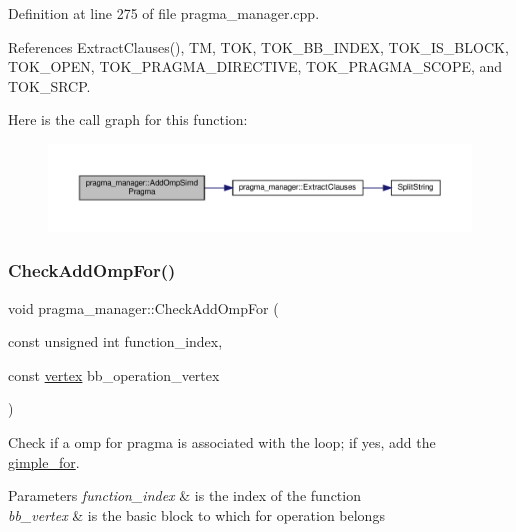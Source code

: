 Definition at line 275 of file pragma\+\_\+manager.\+cpp.



References Extract\+Clauses(), TM, T\+OK, T\+O\+K\+\_\+\+B\+B\+\_\+\+I\+N\+D\+EX, T\+O\+K\+\_\+\+I\+S\+\_\+\+B\+L\+O\+CK, T\+O\+K\+\_\+\+O\+P\+EN, T\+O\+K\+\_\+\+P\+R\+A\+G\+M\+A\+\_\+\+D\+I\+R\+E\+C\+T\+I\+VE, T\+O\+K\+\_\+\+P\+R\+A\+G\+M\+A\+\_\+\+S\+C\+O\+PE, and T\+O\+K\+\_\+\+S\+R\+CP.

Here is the call graph for this function\+:
\nopagebreak
\begin{figure}[H]
\begin{center}
\leavevmode
\includegraphics[width=350pt]{d2/d1d/classpragma__manager_ad0fd54d0ee85c926008a7c0ed76dfaa3_cgraph}
\end{center}
\end{figure}
\mbox{\label{classpragma__manager_a4d74b44eafacef0dd1b64d29f941e692}} 
\subsubsection{\texorpdfstring{Check\+Add\+Omp\+For()}{CheckAddOmpFor()}}
{\footnotesize\ttfamily void pragma\+\_\+manager\+::\+Check\+Add\+Omp\+For (\begin{DoxyParamCaption}\item[{const unsigned int}]{function\+\_\+index,  }\item[{const \hyperlink{graph_8hpp_abefdcf0544e601805af44eca032cca14}{vertex}}]{bb\+\_\+operation\+\_\+vertex }\end{DoxyParamCaption})}



Check if a omp for pragma is associated with the loop; if yes, add the \hyperlink{structgimple__for}{gimple\+\_\+for}. 


\begin{DoxyParams}{Parameters}
{\em function\+\_\+index} & is the index of the function \\
\hline
{\em bb\+\_\+vertex} & is the basic block to which for operation belongs \\
\hline
\end{DoxyParams}


